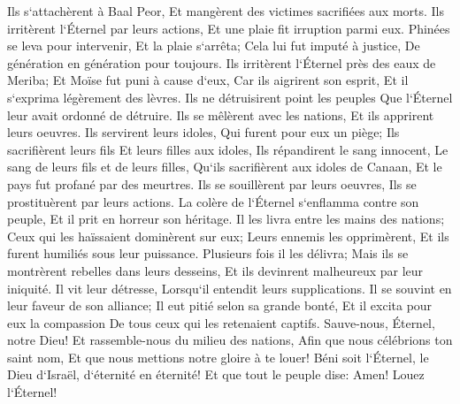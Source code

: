 \verse Ils s`attachèrent à Baal Peor, Et mangèrent des victimes sacrifiées aux morts. 
\verse Ils irritèrent l`Éternel par leurs actions, Et une plaie fit irruption parmi eux. 
\verse Phinées se leva pour intervenir, Et la plaie s`arrêta; 
\verse Cela lui fut imputé à justice, De génération en génération pour toujours. 
\verse Ils irritèrent l`Éternel près des eaux de Meriba; Et Moïse fut puni à cause d`eux, 
\verse Car ils aigrirent son esprit, Et il s`exprima légèrement des lèvres. 
\verse Ils ne détruisirent point les peuples Que l`Éternel leur avait ordonné de détruire. 
\verse Ils se mêlèrent avec les nations, Et ils apprirent leurs oeuvres. 
\verse Ils servirent leurs idoles, Qui furent pour eux un piège; 
\verse Ils sacrifièrent leurs fils Et leurs filles aux idoles, 
\verse Ils répandirent le sang innocent, Le sang de leurs fils et de leurs filles, Qu`ils sacrifièrent aux idoles de Canaan, Et le pays fut profané par des meurtres. 
\verse Ils se souillèrent par leurs oeuvres, Ils se prostituèrent par leurs actions. 
\verse La colère de l`Éternel s`enflamma contre son peuple, Et il prit en horreur son héritage. 
\verse Il les livra entre les mains des nations; Ceux qui les haïssaient dominèrent sur eux; 
\verse Leurs ennemis les opprimèrent, Et ils furent humiliés sous leur puissance. 
\verse Plusieurs fois il les délivra; Mais ils se montrèrent rebelles dans leurs desseins, Et ils devinrent malheureux par leur iniquité. 
\verse Il vit leur détresse, Lorsqu`il entendit leurs supplications. 
\verse Il se souvint en leur faveur de son alliance; 
\verse Il eut pitié selon sa grande bonté, Et il excita pour eux la compassion De tous ceux qui les retenaient captifs. 
\verse Sauve-nous, Éternel, notre Dieu! Et rassemble-nous du milieu des nations, Afin que nous célébrions ton saint nom, Et que nous mettions notre gloire à te louer! 
\verse Béni soit l`Éternel, le Dieu d`Israël, d`éternité en éternité! Et que tout le peuple dise: Amen! Louez l`Éternel! 

\chapter{}

